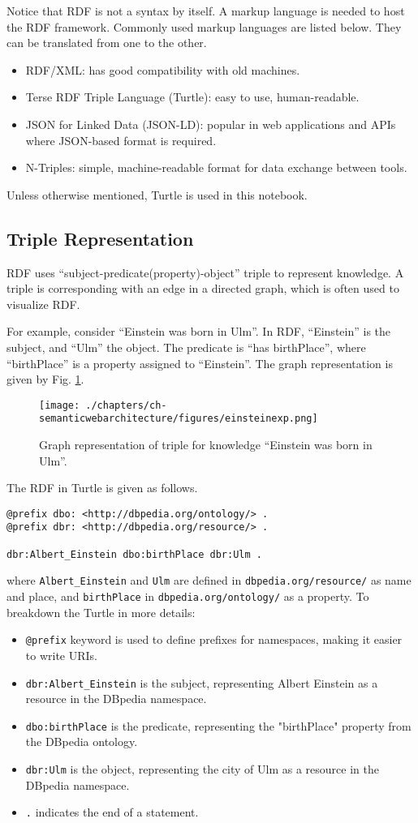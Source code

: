 Notice that RDF is not a syntax by itself. A markup language is needed to host the RDF framework. Commonly used markup languages are listed below. They can be translated from one to the other.
\begin{itemize}
  \item RDF/XML: has good compatibility with old machines.
  \item Terse RDF Triple Language (Turtle): easy to use, human-readable.
  \item JSON for Linked Data (JSON-LD): popular in web applications and APIs where JSON-based format is required.
  \item N-Triples: simple, machine-readable format for data exchange between tools.
\end{itemize}
Unless otherwise mentioned, Turtle is used in this notebook.

\subsection{Triple Representation}

RDF uses ``subject-predicate(property)-object'' triple to represent knowledge. A triple is corresponding with an edge in a directed graph, which is often used to visualize RDF. 

For example, consider ``Einstein was born in Ulm''. In RDF, ``Einstein'' is the subject, and ``Ulm'' the object. The predicate is ``has birthPlace'', where ``birthPlace'' is a property assigned to ``Einstein''. The graph representation is given by Fig. \ref{fig:einsteinexp}.
\begin{figure}[htbp]
	\centering
	\texttt{[image: ./chapters/ch-semanticwebarchitecture/figures/einsteinexp.png]}
	\caption{Graph representation of triple for knowledge ``Einstein was born in Ulm''.}
	\label{fig:einsteinexp}
\end{figure}
The RDF in Turtle is given as follows.
\begin{lstlisting}
@prefix dbo: <http://dbpedia.org/ontology/> .
@prefix dbr: <http://dbpedia.org/resource/> .

dbr:Albert_Einstein dbo:birthPlace dbr:Ulm .
\end{lstlisting}
where \verb|Albert_Einstein| and \verb|Ulm| are defined in \verb|dbpedia.org/resource/| as name and place, and \verb|birthPlace| in \verb|dbpedia.org/ontology/| as a property. To breakdown the Turtle in more details:
\begin{itemize}
  \item \verb|@prefix| keyword is used to define prefixes for namespaces, making it easier to write URIs.
  \item \verb|dbr:Albert_Einstein| is the subject, representing Albert Einstein as a resource in the DBpedia namespace.
  \item \verb|dbo:birthPlace| is the predicate, representing the "birthPlace" property from the DBpedia ontology.
  \item \verb|dbr:Ulm| is the object, representing the city of Ulm as a resource in the DBpedia namespace.
  \item \verb|.| indicates the end of a statement.
\end{itemize}

